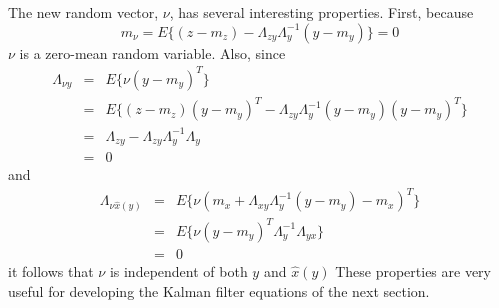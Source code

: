 	The new random vector, $\nu$, has several interesting
properties.  First, because
%
\begin{equation}
m_{\nu}=E\{(z-m_z)-\Lambda_{zy}\Lambda_y^{-1}(y-m_y)\}=0
\label{e.kf.16}
\end{equation}
%
$\nu$ is a zero-mean random variable.  Also, since
%
\begin{eqnarray}
\Lambda_{\nu y}&=&E\{\nu(y-m_y)^T\}\nonumber\\
   &=&E\{(z-m_z)(y-m_y)^T
            -\Lambda_{zy}\Lambda_y^{-1}(y-m_y)(y-m_y)^T\}\nonumber\\
   &=&\Lambda_{zy}-\Lambda_{zy}\Lambda_y^{-1}\Lambda_y\nonumber\\
   &=&0
\label{e.kf.17}
\end{eqnarray}
%
and
%
\begin{eqnarray}
\Lambda_{\nu \hat{x}(y)}&=&
            E\{\nu(m_x+\Lambda_{xy}\Lambda_y^{-1}(y-m_y)-m_x)^T\}\nonumber\\
   &=&E\{\nu(y-m_y)^T\Lambda_y^{-1}\Lambda_{yx}\}\nonumber\\
   &=&0
\label{e.kf.18}
\end{eqnarray}
%
it follows that $\nu$ is independent of both $y$ and $\hat{x}(y)$
These properties
are very useful for developing the Kalman filter equations of the 
next section.

